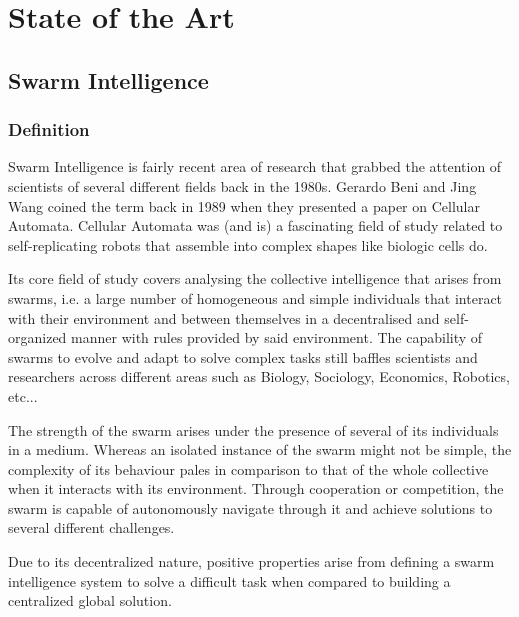 
\chapter{State of the Art}
\label{estadoarte}

\section{Swarm Intelligence}
\subsection{Definition}
Swarm Intelligence is fairly recent area of research that grabbed the attention of scientists of several different fields back in the 1980s. Gerardo Beni and Jing Wang \cite{C_gerardo_beni} coined the term back in 1989 when they presented a paper on Cellular Automata. Cellular Automata was (and is) a fascinating field of study related to self-replicating robots that assemble into complex shapes like biologic cells do.

Its core field of study covers analysing the collective intelligence that arises from swarms, i.e. a large number of homogeneous and simple individuals that interact with their environment and between themselves in a decentralised and self-organized manner with rules provided by said environment. The capability of swarms to evolve and adapt to solve complex tasks still baffles scientists and researchers across different areas such as Biology, Sociology, Economics, Robotics, etc...\cite{A_Resumen_Estado_Swarm}

The strength of the swarm arises under the presence of several of its individuals in a medium. Whereas an isolated instance of the swarm might not be simple, the complexity of its behaviour pales in comparison to that of the whole collective when it interacts with its environment. Through cooperation or competition, the swarm is capable of autonomously navigate through it and achieve solutions to several different challenges.

Due to its decentralized nature, positive properties arise from defining a swarm intelligence system to solve a difficult task when compared to building a centralized global solution.

